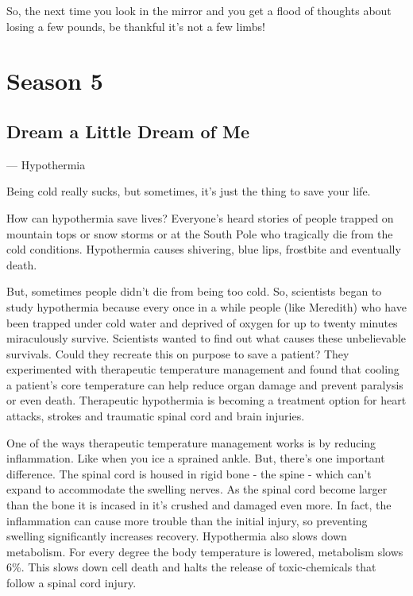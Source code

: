 \documentclass[12pt,a4paper,onecolumn]{article}
\begin{document}
So, the next time you look in the mirror and you get a flood of thoughts about losing a few pounds,
be thankful it's not a few limbs!

\section{Season 5}
\subsection{Dream a Little Dream of Me }
\begin{flushright} --- Hypothermia
\end{flushright}

Being cold really sucks, but sometimes, it's just the thing to save your life.

How can hypothermia\cite{hypothermia} save lives? Everyone's heard stories of people trapped on
mountain tops or snow storms or at the South Pole who tragically die from the cold conditions.
Hypothermia causes shivering, blue lips, frostbite and eventually death.

But, sometimes people didn't die from being too cold. So, scientists began to study hypothermia
because every once in a while people (like Meredith) who have been trapped under cold water and
deprived of oxygen for up to twenty minutes miraculously survive. Scientists wanted to find out what
causes these unbelievable survivals. Could they recreate this on purpose to save a patient? They
experimented with therapeutic\cite{therapeutic} temperature management and found that cooling a
patient's core temperature can help reduce organ damage and prevent paralysis\cite{paralysis} or
even death. Therapeutic hypothermia is becoming a treatment option for heart attacks, strokes and
traumatic spinal cord and brain injuries.

One of the ways therapeutic temperature management works is by reducing
inflammation\cite{inflammation}. Like when you ice a sprained ankle. But, there's one important
difference. The spinal\cite{spinal} cord is housed in rigid bone - the spine - which can't expand to
accommodate the swelling nerves. As the spinal cord become larger than the bone it is incased in
it's crushed and damaged even more. In fact, the inflammation can cause more trouble than the
initial injury, so preventing swelling significantly increases recovery. Hypothermia also slows down
metabolism\cite{metabolism}. For every degree the body temperature is lowered, metabolism slows 6\%.
This slows down cell death and halts the release of toxic-chemicals that follow a spinal cord
injury.
\end{document}
